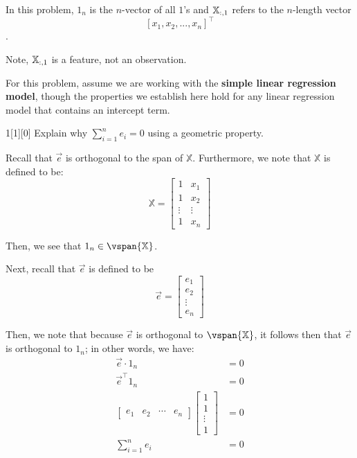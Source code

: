 \documentclass{article}
\begin{document}
In this problem, $1_n$ is the $n$-vector of all $1$'s
and $\Bbb{X}_{:,1}$ refers to the $n$-length vector 
$$[x_1, x_2, ..., x_n]^{\top}$$. 

Note, $\Bbb{X}_{:,1}$ is a feature, not an observation.

For this problem, assume we are working with the \textbf{simple linear regression model}, though the properties we establish here hold for any linear regression model that contains an intercept term.
\begin{dshw}{1}[1][0]
	Explain why $\sum\limits_{i = 1}^n e_i = 0$ using a geometric property.
\end{dshw}
\begin{solution}
	Recall that $\vec{e}$ is orthogonal to the span of $\mathbb X$. Furthermore, we note that $\mathbb X$ is defined to be:
	\begin{equation*}
		\mathbb X = \begin{bmatrix}
			1 & x_{1} \\ 1 & x_{2} \\ \vdots & \vdots \\ 1 & x_{n}
		\end{bmatrix}
	\end{equation*} 

	Then, we see that $1_{n} \in \vspan{\mathbb X}$.
	
	Next, recall that $\vec e$ is defined to be
	\begin{equation*}
		\vec{e} = \begin{bmatrix}
			e_{1} \\ e_{2} \\ \vdots \\ e_{n}
		\end{bmatrix}
	\end{equation*}

	Then, we note that because $\vec e$ is orthogonal to $\vspan{\mathbb X}$, it follows then that $\vec e$ is orthogonal to $1_{n}$; in other words, we have:
	\begin{align*}
		\vec e \cdot 1_{n} &= 0 \\
		\vec{e}^{\intercal}1_{n} &= 0 \\
		\begin{bmatrix} e_{1} & e_{2} & \cdots & e_{n} \end{bmatrix} \begin{bmatrix}
			1 \\ 1 \\ \vdots \\ 1
		\end{bmatrix} &= 0 \\
		\sum_{i=1}^{n} e_{i} &= 0
	\end{align*}
\end{solution}
\end{document}
